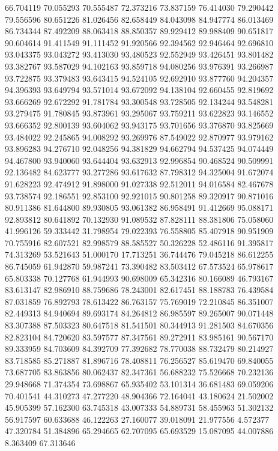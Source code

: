 66.704119
70.055293
70.555487
72.373216
73.837159
76.414030
79.290442
79.556596
80.651226
81.026456
82.658449
84.043098
84.947774
86.013469
86.734344
87.492209
88.063418
88.850357
89.929412
89.988409
90.651817
90.604614
91.411549
91.111452
91.920566
92.394562
92.946464
92.696810
93.043375
93.043272
93.413030
93.480523
92.552949
93.426451
93.801482
93.382767
93.587029
94.102163
93.859718
94.080256
93.976391
93.266987
93.722875
93.379483
93.643415
94.524105
92.692910
93.877760
94.204357
94.396393
93.649794
93.571014
93.672092
94.138104
92.660455
92.819692
93.666269
92.672292
91.781784
93.300548
93.728505
92.134244
93.548281
93.279475
91.780845
93.873961
93.295067
93.759211
93.622823
93.146552
93.666352
92.800139
93.604062
93.943175
93.701656
93.376870
93.825669
93.484022
92.245865
94.008292
93.269976
87.549022
92.870977
93.979162
93.896283
94.276710
92.048256
94.381829
94.662794
94.537425
94.074449
94.467800
93.940060
93.644404
93.632913
92.996854
90.468524
90.509991
92.136482
84.623777
93.277286
93.617632
87.798312
94.325004
91.672074
91.628223
92.474912
91.898000
91.027338
92.512011
94.016584
82.467678
93.738574
92.186551
92.853100
92.921015
90.801258
89.320917
90.871016
80.911386
81.644800
89.930805
93.061382
86.958491
91.412669
95.088171
92.893812
80.641892
70.132930
91.089532
87.828111
88.381806
75.058060
41.996126
59.333442
31.798954
79.022393
76.558805
85.407918
90.951909
70.755916
82.607521
82.998579
88.585527
50.326228
52.486116
91.395817
74.313269
53.521643
51.000170
17.713251
36.744476
79.045218
86.612255
86.745059
61.942870
59.987241
73.390482
83.503412
67.573524
65.978617
65.803338
70.127768
61.944993
90.698009
65.342316
80.166089
46.793167
83.613147
82.986910
88.759686
78.243001
82.617451
88.188783
76.439584
87.031859
76.892793
78.613422
86.763157
75.769019
72.210845
86.351007
82.449313
84.940694
89.693174
84.264812
86.985597
89.265007
90.071448
83.307388
87.503323
80.647518
81.541501
80.344913
91.281503
84.670356
82.823104
84.720620
83.597577
87.347561
89.272911
83.985161
90.567170
89.333959
84.703609
84.392709
77.392682
78.770038
88.732479
80.214927
83.718585
85.271887
81.896716
78.408811
76.256527
85.619470
69.840055
73.687705
83.863856
80.062437
82.347361
56.688232
75.526668
70.232136
29.948668
71.374354
73.698867
65.935402
53.101314
36.681483
69.059206
70.401541
44.310273
47.277220
48.904366
72.164041
43.180624
21.502002
45.905399
57.162300
63.745318
43.007333
54.889731
58.455963
51.302132
56.917597
60.633688
46.122263
27.160077
39.018091
21.977556
4.572377
47.320784
51.384896
65.294665
62.707095
65.693529
15.087095
44.007886
8.363409
67.313646
